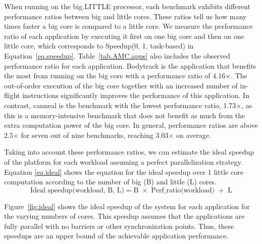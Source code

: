 When running on the big.LITTLE processor, each benchmark exhibits different performance ratios between big and little cores. 
These ratios tell us how many times faster a big core is compared to a little core. 
We measure the performance ratio of each application by executing it first on one big core and then on one little core, which corresponds to Speedup(0, 1, task-based) in Equation~\ref{eq.speedup}. 
Table~\ref{tab.AMC.apps} also includes the observed performance ratio for each application. Bodytrack is the application that benefits the most from running on the big core with a performance ratio of 4.16$\times$. The out-of-order execution of the big core together with an increased number of in-flight instructions significantly improves the performance of this application. In contrast, canneal is the benchmark with the lowest performance ratio, 1.73$\times$, as this is a memory-intensive benchmark that does not benefit as much from the extra computation power of the big core. In general, performance ratios are above 2.5$\times$ for seven out of nine benchmarks, reaching 3.03$\times$ on average. 


Taking into account these performance ratios, we can estimate the ideal speedup of the platform for 
each workload assuming a perfect parallelization strategy. Equation \ref{eq.ideal} shows the 
equation for the ideal speedup over 1 little core computation according to the number of big (B) and 
little (L) cores.
\begingroup\makeatletter\def\f@size{8}\check@mathfonts
\begin{equation}
\text{Ideal speedup(workload, B, L)} = \text{B $\times$ Perf\_ratio(workload) $+$ L}
\label{eq.ideal}
\end{equation}
\endgroup


Figure~\ref{fig:ideal} shows the ideal speedup of the system for each application for the varying 
numbers of cores. This speedup assumes that the applications are fully parallel with no barriers or 
other synchronization points. Thus, these speedups are an upper bound of the achievable application performance.




